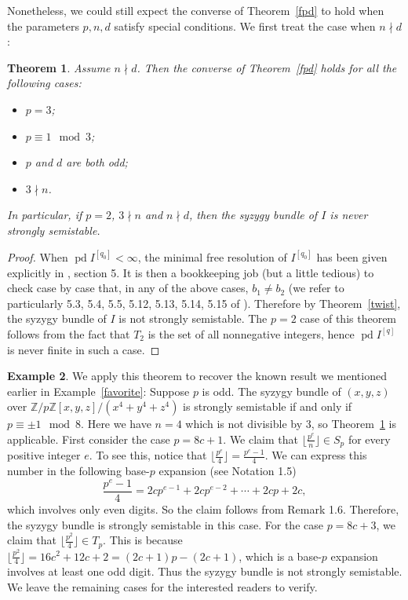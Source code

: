 \documentclass[draft]{amsart}
\newtheorem{theorem}{Theorem}[section]
\theoremstyle{definition}
\newtheorem{example}[theorem]{Example}
\numberwithin{equation}{theorem}
\begin{document}
\noindent Nonetheless, we could still expect the converse of Theorem~\ref{fpd} to hold when the parameters $p, n, d$ satisfy special conditions. We first treat the case when $n \nmid d$:
\begin{theorem}\label{conv1}
Assume $n \nmid d$. Then the converse of Theorem~\ref{fpd} holds for all the following cases:
\begin{itemize}
\item[Case 1:]$p=3$;
\item[Case 2:]$p \equiv 1 \mod 3$; 
\item[Case 3:]$p$ and $d$ are both odd;
\item[Case 4:]$3 \nmid n$.
\end{itemize}
In particular, if $p=2$, $3 \nmid n$ and $n \nmid d$, then the syzygy bundle of $I$ is never strongly semistable.
\end{theorem}

\begin{proof} When ${\mathop{\mathrm{pd}}\nolimits} I^{[q_0]}<{{\infty}}$, the minimal free resolution of  $I^{[q_0]}$ has been given explicitly in \cite{KRV}, section 5. It is then a bookkeeping job (but a little tedious) to check case by case that, in any of the above cases, $b_1 \neq b_2$ (we refer to particularly 5.3, 5.4, 5.5, 5.12, 5.13, 5.14, 5.15 of \cite{KRV}). Therefore by Theorem~\ref{twist}, the syzygy bundle of $I$ is not strongly semistable. The $p=2$ case of this theorem follows from the fact that $T_2$ is the set of all nonnegative integers, hence $ {\mathop{\mathrm{pd}}\nolimits} I^{[q]}$ is never finite in such a case.
\end{proof}

\begin{example}\label{favorite1} We apply this theorem to recover the known result we mentioned earlier in Example~\ref{favorite}: Suppose $p$ is odd. The syzygy bundle of $(x,y,z)$ over ${\mathbb Z}/p{\mathbb Z}[x,y,z]/(x^4+y^4+z^4)$ is strongly semistable if and only if $p \equiv \pm 1 \mod 8$. Here we have $n=4$ which is not divisible by $3$, so Theorem~\ref{conv1} is applicable. First consider the case $p=8c+1$. We claim that ${{\lfloor}}\frac{p^e}{n} {{\rfloor}}\in S_p$ for every positive integer $e$. To see this, notice that ${{\lfloor}}\frac{p^e}{4} {{\rfloor}}=\frac{p^e-1}{4}$. We can express this number in the following base-$p$ expansion (see \cite{KRV} Notation 1.5) 
$$\frac{p^e-1}{4}=2cp^{e-1}+2cp^{e-2}+ \cdots +2cp+2c, $$
which involves only even digits. So the claim follows from \cite{KRV} Remark 1.6. Therefore, the syzygy bundle is strongly semistable in this case. For the case $p=8c+3$, we claim that  ${{\lfloor}}\frac{p^2}{4} {{\rfloor}}\in T_p$. This is because ${{\lfloor}}\frac{p^2}{4} {{\rfloor}}=16c^2+12c+2=(2c+1)p-(2c+1)$, which is a base-$p$ expansion involves at least one odd digit. Thus the syzygy bundle is not strongly semistable. We leave the remaining cases for the interested readers to verify.
\end{example}
\end{document}
